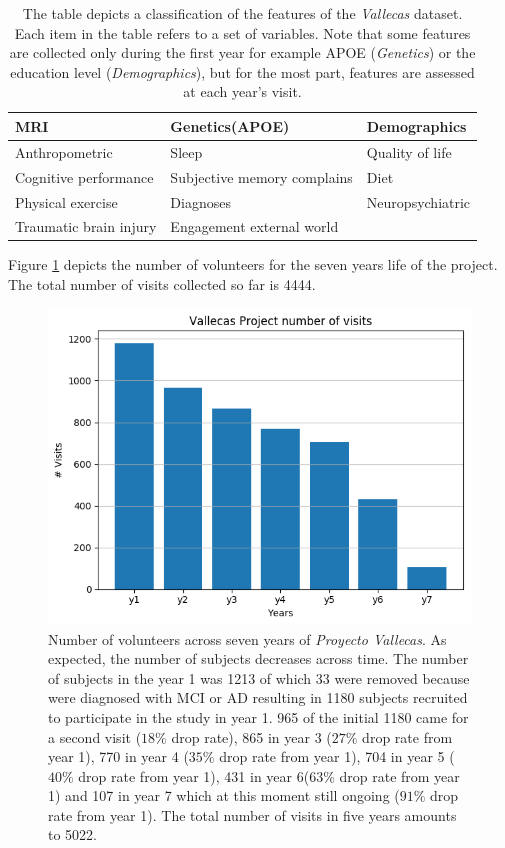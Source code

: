 \documentclass[11pt]{article}
\theoremstyle{definition}
\theoremstyle{remark}
\begin{document}
\begin{table}
\begin{tabular}{ |p{4.4cm}|p{4.4cm}|p{4.4cm}| }
\hline
\hline
MRI & Genetics(APOE) & Demographics  \\
\hline
Anthropometric & Sleep & Quality of life \\
\hline
Cognitive performance & Subjective memory complains & Diet \\
\hline
Physical exercise & Diagnoses & Neuropsychiatric \\
\hline
Traumatic brain injury & Engagement external world &  \\
\hline

\hline
\end{tabular}
\caption{The table depicts a classification of the features of the \emph{Vallecas} dataset. Each item in the table refers to a set of variables. Note that some features are collected only during the first year for example APOE (\emph{Genetics}) or the education level (\emph{Demographics}), but for the most part, features are assessed at each year's visit.}
\label{tab:vallecasvars}
\end{table}

Figure \ref{fig:pv5years} depicts the number of volunteers for the seven years life of the project. The total number of visits collected so far is 4444. 

\begin{figure}[H]
        \centering
        \includegraphics[keepaspectratio, width=0.6\linewidth]{figures/Fig_visits}
        \caption{Number of volunteers across seven years of \emph{Proyecto Vallecas}. As expected, the number of subjects decreases across time. The number of subjects in the year 1 was 1213 of which 33 were removed because were diagnosed with MCI or AD resulting in 1180 subjects recruited to participate in the study in year 1. 965 of the initial 1180 came for a second visit ($18\%$ drop rate), 865 in year 3 ($27\%$ drop rate from year 1), 770 in year 4 ($35\%$ drop rate from year 1), 704 in year 5 ($40\%$ drop rate from year 1), 431 in year 6($63\%$ drop rate from year 1) and 107 in year 7 which at this moment still ongoing ($91\%$ drop rate from year 1). The total number of visits in five years amounts to 5022.} \label{fig:pv5years}
\end{figure}
\end{document}
